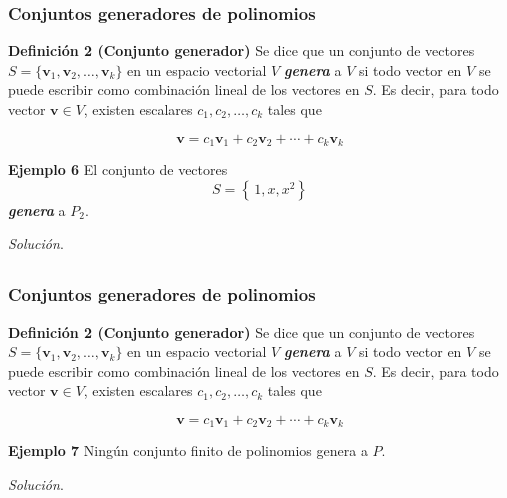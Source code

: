 \begin{frame}\frametitle{Conjuntos generadores de polinomios}

\begin{block}{\textbf{Definición 2 (Conjunto generador)}}
	\justifying
	Se dice que un conjunto de vectores $S=\{\mathbf{v}_1,\mathbf{v}_2,\hdots,\mathbf{v}_k\}$ en un espacio 
	vectorial $V$ \textbf{\textit{genera}} a $V$ si todo vector en $V$ se puede escribir como combinación lineal
	de los vectores en $S$. Es decir, para todo vector $\mathbf{v}\in V$, existen escalares $c_1,c_2,\hdots,c_k$
	tales que 
	
	\vspace{-3mm}
	\[
	\mathbf{v} = c_1\mathbf{v}_1 + c_2\mathbf{v}_2 + \cdots + c_k\mathbf{v}_k
	\]
	
\end{block}

\vspace{0mm}

\begin{ej}{\textbf{Ejemplo 6}} \justifying
	El conjunto de vectores
	\[
	S = \left\{ \, 1, x, x^2 \right\}
	\]
	\textbf{\textit{genera}} a $P_2$.
\end{ej}	

\textit{Solución}.

\end{frame}


\subsection{}

\begin{frame}\frametitle{Conjuntos generadores de polinomios}

\begin{block}{\textbf{Definición 2 (Conjunto generador)}}
	\justifying
	Se dice que un conjunto de vectores $S=\{\mathbf{v}_1,\mathbf{v}_2,\hdots,\mathbf{v}_k\}$ en un espacio 
	vectorial $V$ \textbf{\textit{genera}} a $V$ si todo vector en $V$ se puede escribir como combinación lineal
	de los vectores en $S$. Es decir, para todo vector $\mathbf{v}\in V$, existen escalares $c_1,c_2,\hdots,c_k$
	tales que 
	
	\vspace{-3mm}
	\[
	\mathbf{v} = c_1\mathbf{v}_1 + c_2\mathbf{v}_2 + \cdots + c_k\mathbf{v}_k
	\]
	
\end{block}

\vspace{0mm}

\begin{ej}{\textbf{Ejemplo 7}} \justifying
	Ningún conjunto finito de polinomios genera a $P$.
\end{ej}	

\textit{Solución}.

\end{frame}

